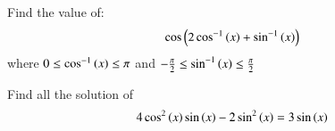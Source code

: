 \iffalse
\title{Assignment}
\author{Arjun Pavanje}
\section{subjective}
\fi
\item Find the value of: 
\begin{align*}
\cos \left(2\cos ^{-1}\left(x\right)+\sin ^{-1}\left(x\right)\right) 
\end{align*}
where $0\le \cos ^{-1}\left(x\right) \le \pi$ and $-\frac{\pi}{2}\le \sin ^{-1}\left(x\right) \le\frac{\pi}{2}$
\hfill {}
\item Find all the solution of
\begin{align*}
4\cos ^2\left(x\right)\sin \left(x\right)-2\sin ^2 \left(x\right) = 3\sin \left(x\right)
\end{align*}
\hfill {}
